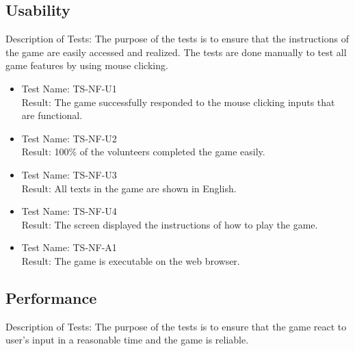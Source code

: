 \documentclass[12pt, titlepage]{article}
\begin{document}
\subsection{Usability}
Description of Tests: The purpose of the tests is to ensure that the instructions of the game are easily accessed and realized. The tests are done manually to test all game features by using mouse clicking.

\begin{itemize}
\item[]
Test Name: TS-NF-U1\\
Result: The game successfully responded to the mouse clicking inputs that are functional.

\item[]
Test Name: TS-NF-U2\\
Result: 100\% of the volunteers completed the game easily.

\item[]
Test Name: TS-NF-U3\\
Result: All texts in the game are shown in English.

\item[]
Test Name: TS-NF-U4\\
Result: The screen displayed the instructions of how to play the game.

\item[]
Test Name: TS-NF-A1\\
Result: The game is executable on the web browser.

\end{itemize}

		
\subsection{Performance}
Description of Tests: The purpose of the tests is to ensure that the game react to user's input in a reasonable time and the game is reliable.
\end{document}
